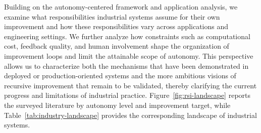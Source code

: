Building on the autonomy-centered framework and application analysis, we examine what responsibilities industrial systems assume for their own improvement and how these responsibilities vary across applications and engineering settings. We further analyze how constraints such as computational cost, feedback quality, and human involvement shape the organization of improvement loops and limit the attainable scope of autonomy. This perspective allows us to characterize both the mechanisms that have been demonstrated in deployed or production-oriented systems and the more ambitious visions of recursive improvement that remain to be validated, thereby clarifying the current progress and limitations of industrial \RSI{} practice. Figure~\ref{fig:rsi-landscape} reports the surveyed literature by autonomy level and improvement target, while Table~\ref{tab:industry-landscape} provides the corresponding landscape of industrial systems.





